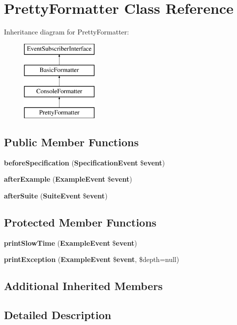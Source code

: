 \section{Pretty\+Formatter Class Reference}
\label{class_php_spec_1_1_formatter_1_1_pretty_formatter}
Inheritance diagram for Pretty\+Formatter\+:\begin{figure}[H]
\begin{center}
\leavevmode
\includegraphics[height=4.000000cm]{class_php_spec_1_1_formatter_1_1_pretty_formatter}
\end{center}
\end{figure}
\subsection*{Public Member Functions}
\begin{DoxyCompactItemize}
\item 
{\bf before\+Specification} ({\bf Specification\+Event} \${\bf event})
\item 
{\bf after\+Example} ({\bf Example\+Event} \${\bf event})
\item 
{\bf after\+Suite} ({\bf Suite\+Event} \${\bf event})
\end{DoxyCompactItemize}
\subsection*{Protected Member Functions}
\begin{DoxyCompactItemize}
\item 
{\bf print\+Slow\+Time} ({\bf Example\+Event} \${\bf event})
\item 
{\bf print\+Exception} ({\bf Example\+Event} \${\bf event}, \$depth=null)
\end{DoxyCompactItemize}
\subsection*{Additional Inherited Members}


\subsection{Detailed Description}


